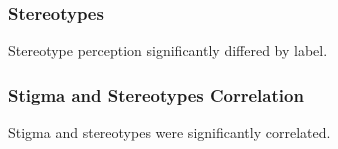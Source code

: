 \documentclass[
  man,
  floatsintext,
  longtable,
  nolmodern,
  notxfonts,
  notimes,
  colorlinks=true,linkcolor=blue,citecolor=blue,urlcolor=blue]{apa7}
\begin{document}
\subsubsection{Stereotypes}\label{stereotypes}

Stereotype perception significantly differed by label.

\begin{figure}

\caption{\label{fig-stereotype-by-label}}


\end{figure}%

\subsubsection{Stigma and Stereotypes
Correlation}\label{stigma-and-stereotypes-correlation}

Stigma and stereotypes were significantly correlated.
\end{document}
